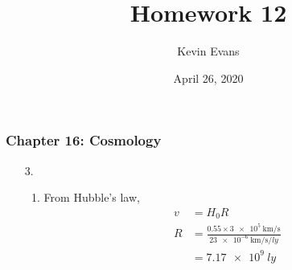 \documentclass{homework}
\title{Homework 12}
\author{Kevin Evans}
\date{April 26, 2020}
\newcommand{\1}{\mathds{1}}
\begin{document}
	\maketitle
	\subsubsection*{Chapter 16: Cosmology}
	\begin{enumerate}[label={\arabic*.}]
		\item[3.] \begin{enumerate}
			\item From Hubble's law,  \begin{align*}
				v & = H_0 R \\
				R & = \frac{ 0.55 \times \SI{3e5}{\km/\s} }{\SI{23e-6}{\km/\s/ly}} \\
				& = \SI{7.17e9}{ly}
			\end{align*}
			

\end{enumerate}
\end{enumerate}
\end{document}
